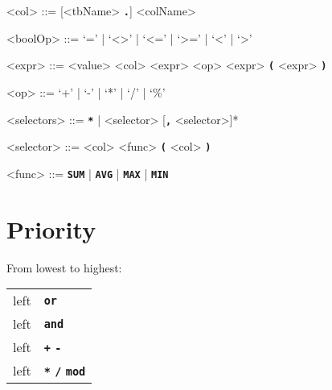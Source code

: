 \documentclass{article}
\renewcommand{\t}[1]{\texttt{\textbf{#1}}}
\begin{document}
\begin{grammar}
<col> ::= [<tbName> \t{.}] <colName>

<boolOp> ::= `=' | `<>' | `<=' | `>=' | `<' | `>'

<expr> ::= <value>
\alt <col>
\alt <expr> <op> <expr>
\alt \t{(} <expr> \t{)}

<op> ::= `+' | `-' | `*' | `/' | `\%'

<selectors> ::= \t{*} | <selector> [\t{,} <selector>]*

<selector> ::= <col>
\alt <func> \t{(} <col> \t{)}

<func> ::= \t{SUM} | \t{AVG} | \t{MAX} | \t{MIN}

\end{grammar}

\section{Priority}

From lowest to highest:

\begin{center}
    \begin{tabular}{cl}
        left & \t{or} \\
        left & \t{and} \\
        left & \t{+} \t{-} \\
        left & \t{*} \t{/} \t{mod} \\
    \end{tabular}
\end{center}
\end{document}
